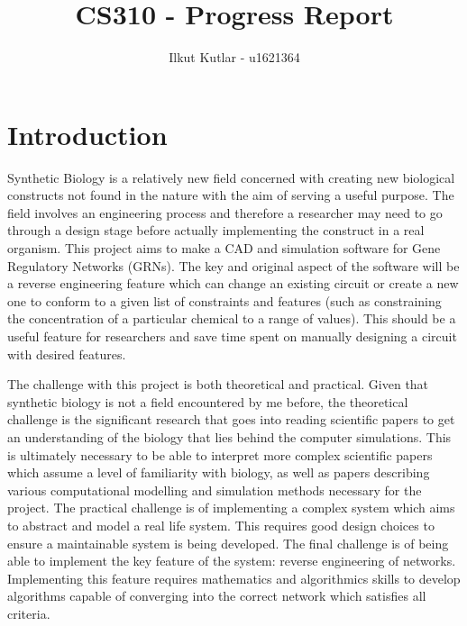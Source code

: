\documentclass{article}
\author{Ilkut Kutlar - u1621364}
\title{CS310 - Progress Report}
\begin{document}
	\maketitle
	\tableofcontents
	
	\newpage
	
	\section{Introduction}
	
	Synthetic Biology is a relatively new field concerned with creating new biological constructs not found in the nature with the aim of serving a useful purpose. The field involves an engineering process and therefore a researcher may need to go through a design stage before actually implementing the construct in a real organism. This project aims to make a CAD and simulation software for Gene Regulatory Networks (GRNs). The key and original aspect of the software will be a reverse engineering feature which can change an existing circuit or create a new one to conform to a given list of constraints and features (such as constraining the concentration of a particular chemical to a range of values). This should be a useful feature for researchers and save time spent on manually designing a circuit with desired features.
	
	
	The challenge with this project is both theoretical and practical. Given that synthetic biology is not a field 
	encountered by me before, the theoretical challenge is the significant research that goes into reading scientific papers to get an understanding of the biology that lies behind the computer simulations. This is ultimately necessary to be able to interpret more complex scientific papers which assume a level of familiarity with biology, as well as papers describing various computational modelling and simulation methods necessary for the project. The practical challenge is of implementing a complex system which aims to abstract and model a real life system. This requires good design choices to ensure a maintainable system is being developed. The final challenge is of being able to implement the key feature of the system: reverse engineering of networks. Implementing this feature requires mathematics and algorithmics skills to develop algorithms capable of converging into the correct network which satisfies all criteria.
	
\end{document}
